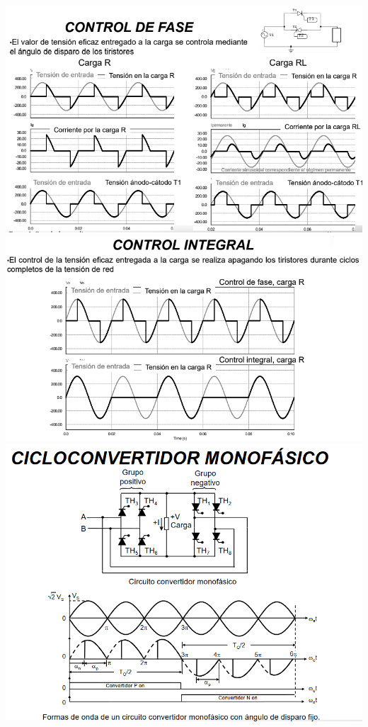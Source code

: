 \documentclass[12pt,a4paper]{article}
\begin{document}
\includegraphics[scale=0.8]{imagenes/CA_CA_FAS.PNG} 
\linebreak
\linebreak
\linebreak
\includegraphics[scale=0.8]{imagenes/CA_CA_INT.PNG}
\newpage
\includegraphics[scale=0.8]{imagenes/CA_CA_CI.PNG}
\end{document}
